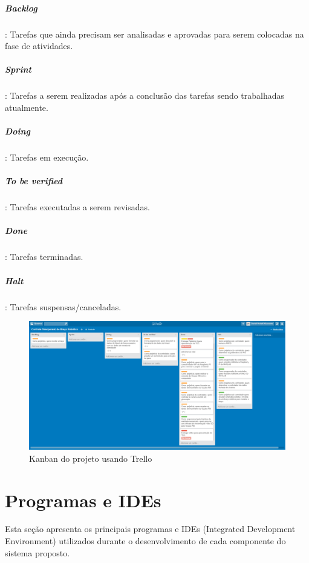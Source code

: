 	\subparagraph{Backlog}: Tarefas que ainda precisam ser analisadas e aprovadas para serem colocadas na fase de atividades.
	\subparagraph{Sprint}: Tarefas a serem realizadas após a conclusão das tarefas sendo trabalhadas atualmente.
	\subparagraph{Doing}: Tarefas em execução.
	\subparagraph{To be verified}: Tarefas executadas a serem revisadas.
	\subparagraph{Done}: Tarefas terminadas.
	\subparagraph{Halt}: Tarefas suspensas/canceladas.

		\begin{figure}[h!]
		\caption{\label{fig_trello} Kanban do projeto usando Trello }
		\begin{center}
	\includegraphics[width=\textwidth]{trello.png}	
	\end{center}
	\end{figure}
	
	
	\section{Programas e IDEs}\label{sec-requisitos}
	Esta seção apresenta os principais programas e IDEs (Integrated Development Environment) utilizados durante o desenvolvimento de cada componente do sistema proposto.
